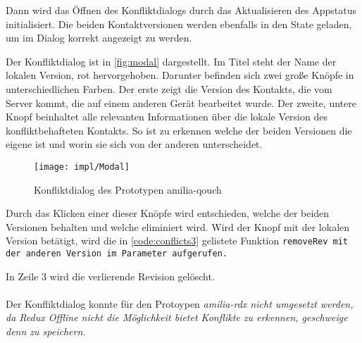 %
Dann wird das Öffnen des Konfliktdialogs durch das Aktualisieren des \gls{App}status initialisiert.
Die beiden Kontaktversionen werden ebenfalls in den State geladen, um im Dialog korrekt angezeigt zu werden.
%
\begin{center}
  
\end{center}
%
Der Konfliktdialog ist in \autoref{fig:modal} dargestellt.
Im Titel steht der Name der lokalen Version, rot hervorgehoben.
Darunter befinden sich zwei große Knöpfe in unterschiedlichen Farben.
Der erste zeigt die Version des Kontakts, die vom Server kommt, die auf einem anderen Gerät bearbeitet wurde.
Der zweite, untere Knopf beinhaltet alle relevanten Informationen über die lokale Version des konfliktbehafteten Kontakts.
So ist zu erkennen welche der beiden Versionen die eigene ist und worin sie sich von der anderen unterscheidet.
%
\begin{figure}[H]
  \centering
  \texttt{[image: impl/Modal]}
  \grayRule
  \caption{Konfliktdialog des Prototypen amilia-qouch}
  \label{fig:modal}
\end{figure}
%
Durch das Klicken einer dieser Knöpfe wird entschieden, welche der beiden Versionen behalten und welche eliminiert wird.
Wird der Knopf mit der lokalen Version betätigt, wird die in \autoref{code:conflicts3} gelistete Funktion \tt{removeRev} mit der anderen Version im Parameter aufgerufen.
%
\begin{center}
  
\end{center}
%
In Zeile 3 wird die verlierende Revision gelöscht.\\\\
%
%
Der Konfliktdialog konnte für den Protoypen \it{amilia-rdx} nicht umgesetzt werden, da Redux Offline nicht die Möglichkeit bietet Konflikte zu erkennen, geschweige denn zu speichern.